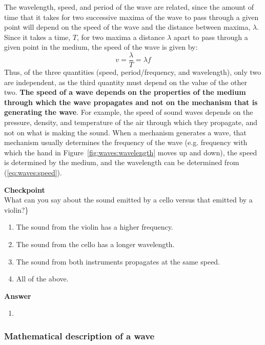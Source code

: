 The wavelength, speed, and period of the wave are related, since the amount of time that it takes for two successive maxima of the wave to pass through a given point will depend on the speed of the wave and the distance between maxima, $\lambda$. Since it takes a time, $T$, for two maxima a distance $\lambda$ apart to pass through a given point in the medium, the speed of the wave is given by:
\begin{equation}
\label{eq:waves:speed}
\boxed{v = \frac{\lambda}{T}=\lambda f}
\end{equation}
Thus, of the three quantities (speed, period/frequency, and wavelength), only two are independent, as the third quantity must depend on the value of the other two. \textbf{The speed of a wave depends on the properties of the medium through which the wave propagates and not on the mechanism that is generating the wave}. For example, the speed of sound waves depends on the pressure, density, and temperature of the air through which they propagate, and not on what is making the sound. When a mechanism generates a wave, that mechanism usually determines the frequency of the wave (e.g. frequency with which the hand in Figure~\ref{fig:waves:wavelength} moves up and down), the speed is determined by the medium, and the wavelength can be determined from (\ref{eq:waves:speed}).

\begin{framed}
\textbf{Checkpoint}\\
What can you say about the sound emitted by a cello versus that emitted by a violin?\}

\begin{enumerate}
\item The sound from the violin has a higher frequency.
\item The sound from the cello has a longer wavelength.
\item The sound from both instruments propagates at the same speed.
\item All of the above.
\end{enumerate}

\begin{framed}
\textbf{Answer}\\
\begin{enumerate}[resume]
\item
\end{enumerate}
\end{framed}
\end{framed}

\subsubsection{Mathematical description of a wave}

